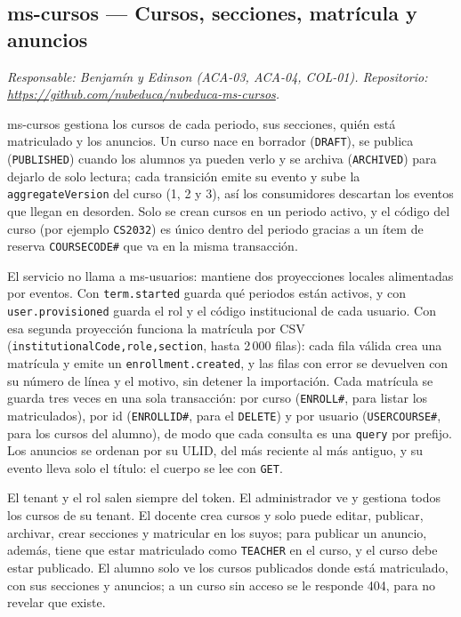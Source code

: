 \subsection{ms-cursos --- Cursos, secciones, matrícula y anuncios}
\label{sec:ms-cursos}
\textit{Responsable: Benjamín y Edinson (ACA-03, ACA-04, COL-01). Repositorio: \url{https://github.com/nubeduca/nubeduca-ms-cursos}.}

ms-cursos gestiona los cursos de cada periodo, sus secciones, quién está matriculado y los anuncios. Un curso nace en borrador (\texttt{DRAFT}), se publica (\texttt{PUBLISHED}) cuando los alumnos ya pueden verlo y se archiva (\texttt{ARCHIVED}) para dejarlo de solo lectura; cada transición emite su evento y sube la \texttt{aggregateVersion} del curso (1, 2 y 3), así los consumidores descartan los eventos que llegan en desorden. Solo se crean cursos en un periodo activo, y el código del curso (por ejemplo \texttt{CS2032}) es único dentro del periodo gracias a un ítem de reserva \texttt{COURSECODE\#} que va en la misma transacción.

El servicio no llama a ms-usuarios: mantiene dos proyecciones locales alimentadas por eventos. Con \texttt{term.started} guarda qué periodos están activos, y con \texttt{user.provisioned} guarda el rol y el código institucional de cada usuario. Con esa segunda proyección funciona la matrícula por CSV (\texttt{institutionalCode,role,section}, hasta 2\,000 filas): cada fila válida crea una matrícula y emite un \texttt{enrollment.created}, y las filas con error se devuelven con su número de línea y el motivo, sin detener la importación. Cada matrícula se guarda tres veces en una sola transacción: por curso (\texttt{ENROLL\#}, para listar los matriculados), por id (\texttt{ENROLLID\#}, para el \texttt{DELETE}) y por usuario (\texttt{USERCOURSE\#}, para los cursos del alumno), de modo que cada consulta es una \texttt{query} por prefijo. Los anuncios se ordenan por su ULID, del más reciente al más antiguo, y su evento lleva solo el título: el cuerpo se lee con \texttt{GET}.

El tenant y el rol salen siempre del token. El administrador ve y gestiona todos los cursos de su tenant. El docente crea cursos y solo puede editar, publicar, archivar, crear secciones y matricular en los suyos; para publicar un anuncio, además, tiene que estar matriculado como \texttt{TEACHER} en el curso, y el curso debe estar publicado. El alumno solo ve los cursos publicados donde está matriculado, con sus secciones y anuncios; a un curso sin acceso se le responde 404, para no revelar que existe.

